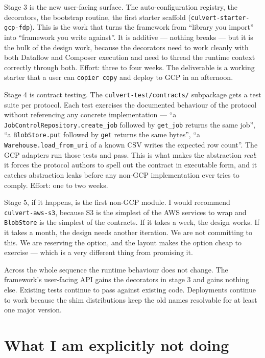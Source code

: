 \documentclass[
  11pt,
  british,
  oneside]{book}
\begin{document}
Stage 3 is the new user-facing surface. The auto-configuration registry,
the decorators, the bootstrap routine, the first starter scaffold
(\texttt{culvert-starter-gcp-fdp}). This is the work that turns the
framework from ``library you import'' into ``framework you write
against''. It is additive --- nothing breaks --- but it is the bulk of
the design work, because the decorators need to work cleanly with both
Dataflow and Composer execution and need to thread the runtime context
correctly through both. Effort: three to four weeks. The deliverable is
a working starter that a user can \texttt{copier\ copy} and deploy to
GCP in an afternoon.

Stage 4 is contract testing. The \texttt{culvert-test/contracts/}
subpackage gets a test suite per protocol. Each test exercises the
documented behaviour of the protocol without referencing any concrete
implementation --- ``a \texttt{JobControlRepository.create\_job}
followed by \texttt{get\_job} returns the same job'', ``a
\texttt{BlobStore.put} followed by \texttt{get} returns the same
bytes'', ``a \texttt{Warehouse.load\_from\_uri} of a known CSV writes
the expected row count''. The GCP adapters run those tests and pass.
This is what makes the abstraction \emph{real}: it forces the protocol
authors to spell out the contract in executable form, and it catches
abstraction leaks before any non-GCP implementation ever tries to
comply. Effort: one to two weeks.

Stage 5, if it happens, is the first non-GCP module. I would recommend
\texttt{culvert-aws-s3}, because S3 is the simplest of the AWS services
to wrap and \texttt{BlobStore} is the simplest of the contracts. If it
takes a week, the design works. If it takes a month, the design needs
another iteration. We are not committing to this. We are reserving the
option, and the layout makes the option cheap to exercise --- which is a
very different thing from promising it.

Across the whole sequence the runtime behaviour does not change. The
framework's user-facing API gains the decorators in stage 3 and gains
nothing else. Existing tests continue to pass against existing code.
Deployments continue to work because the shim distributions keep the old
names resolvable for at least one major version.

\hypertarget{what-i-am-explicitly-not-doing}{%
\section{What I am explicitly not
doing}\label{what-i-am-explicitly-not-doing}}
\end{document}
